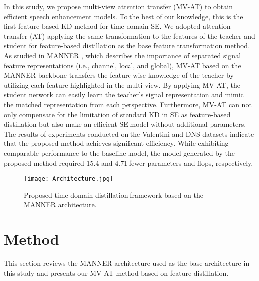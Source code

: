 \documentclass[a4paper]{article}
\begin{document}
In this study, we propose multi-view attention transfer (MV-AT) to obtain efficient speech enhancement models. To the best of our knowledge, this is the first feature-based KD method for time domain SE. We adopted attention transfer (AT) \cite{zagoruyko2016paying} applying the same transformation to the features of the teacher and student for feature-based distillation as the base feature transformation method. As studied in MANNER \cite{park2022manner}, which describes the importance of separated signal feature representations (i.e., channel, local, and global), MV-AT based on the MANNER backbone transfers the feature-wise knowledge of the teacher by utilizing each feature highlighted in the multi-view. By applying MV-AT, the student network can easily learn the teacher’s signal representation and mimic the matched representation from each perspective. Furthermore, MV-AT can not only compensate for the limitation of standard KD in SE as feature-based distillation but also make an efficient SE model without additional parameters. The results of experiments conducted on the Valentini and DNS datasets indicate that the proposed method achieves significant efficiency. While exhibiting comparable performance to the baseline model, the model generated by the proposed method required 15.4 and 4.71 fewer parameters and flops, respectively.
\begin{figure*}[t]
  \centering
  \texttt{[image: Architecture.jpg]} \caption{Proposed time domain distillation framework based on the MANNER architecture.} \label{fig:architecture}
\end{figure*}
\section{Method}
This section reviews the MANNER \cite{park2022manner} architecture used as the base architecture in this study and presents our MV-AT method based on feature distillation.
\end{document}
